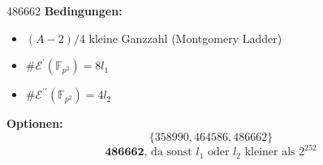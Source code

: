 \begin{frame}{486662}
\textbf{Bedingungen:}
    \begin{itemize}
        \item $(A-2)/4$ kleine Ganzzahl (Montgomery Ladder)
        \item $\#\mathcal{E}^\prime(\mathbb{F}_{p^2})=8l_1$ 
        \item $\#\mathcal{E}^{\prime\prime}(\mathbb{F}_{p^2})=4l_2$
    \end{itemize}
\textbf{Optionen:}
    \[\{358990,464586,486662\}\]
    \[\textbf{486662}\text{, da sonst $l_1$ oder $l_2$ kleiner als $2^{252}$}\]
\end{frame}